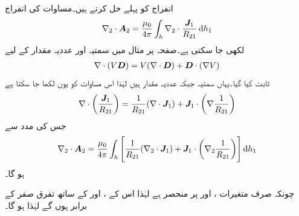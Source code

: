 انفراج کو پہلے حل کرتے ہیں۔مساوات  کی انفراج
\begin{align}
\nabla_2 \cdot \kvec{A}_2=\frac{\mu_0}{4\pi}\int_h \nabla_2 \cdot \frac{\kvec{J}_1}{R_{21}} \dif h_1
\end{align}
لکھی جا سکتی ہے۔صفحہ  پر مثال  میں سمتیہ  اور عددیہ مقدار  کے لیے
\begin{align*}
\nabla \cdot  (V {{\boldsymbol{D}}})=V (\nabla \cdot {\ensuremath{{\boldsymbol{D}}}})+{{\boldsymbol{D}}} \cdot (\nabla V)
\end{align*}
ثابت کیا گیا۔یہاں سمتیہ  جبکہ عددیہ مقدار  ہیں لہٰذا اس مساوات کو یوں لکھا جا سکتا ہے
\begin{align}\label{مساوات_مقناطیسی_سمتیہ_اور_غیر_سمتی_کے_حاصل_ضرب_کی_گردش_ب}
\nabla \cdot  \left(\frac{ {{\boldsymbol{J}}}_1}{R_{21}}\right)=\frac{1}{R_{21}} (\nabla \cdot {\ensuremath{{\boldsymbol{J}}}}_1)+{{\boldsymbol{J}}}_1 \cdot \left(\nabla \frac{1}{R_{21}}\right)
\end{align}
 جس کی مدد سے
\begin{align}
\nabla_2 \cdot \kvec{A}_2=\frac{\mu_0}{4\pi}\int_h \left[\frac{1}{R_{21}} (\nabla_2 \cdot \kvec{J}_1)+\kvec{J}_1 \cdot \left(\nabla_2 \frac{1}{R_{21}}\right)\right] \dif h_1
\end{align}
ہو گا۔

چونکہ  صرف متغیرات ،  اور  پر منحصر ہے لہٰذا اس کے ،  اور  کے ساتھ تفرق صفر کے برابر ہوں گے لہٰذا  ہو گا۔

